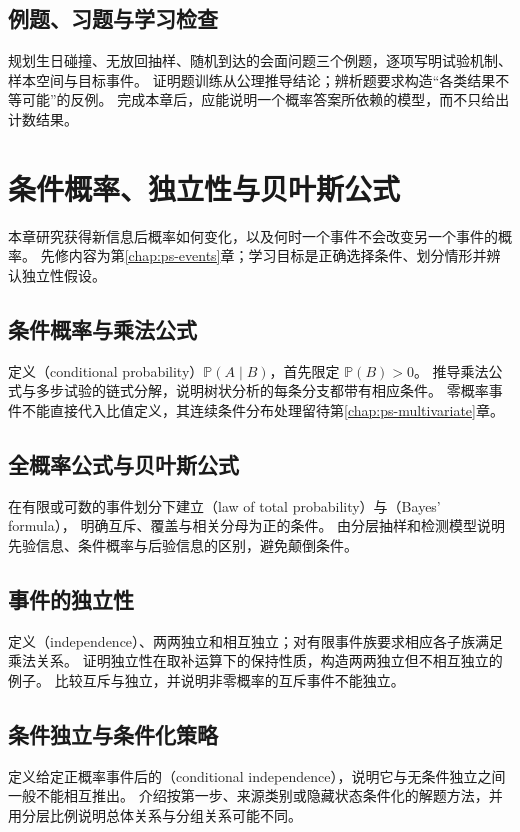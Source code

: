 \documentclass[UTF8,12pt,a4paper,fontset=fandol]{ctexbook}
\begin{document}
\section{例题、习题与学习检查}
规划生日碰撞、无放回抽样、随机到达的会面问题三个例题，逐项写明试验机制、样本空间与目标事件。
证明题训练从公理推导结论；辨析题要求构造“各类结果不等可能”的反例。
完成本章后，应能说明一个概率答案所依赖的模型，而不只给出计数结果。


\chapter{条件概率、独立性与贝叶斯公式}
\label{chap:ps-conditioning}

本章研究获得新信息后概率如何变化，以及何时一个事件不会改变另一个事件的概率。
先修内容为第\ref{chap:ps-events}章；学习目标是正确选择条件、划分情形并辨认独立性假设。

\section{条件概率与乘法公式}
\label{sec:ps-conditional-probability}
定义（conditional probability）$\mathbb P(A\mid B)$，首先限定 $\mathbb P(B)>0$。
推导乘法公式与多步试验的链式分解，说明树状分析的每条分支都带有相应条件。
零概率事件不能直接代入比值定义，其连续条件分布处理留待第\ref{chap:ps-multivariate}章。

\section{全概率公式与贝叶斯公式}
\label{sec:ps-total-bayes}
在有限或可数的事件划分下建立（law of total probability）与（Bayes' formula），
明确互斥、覆盖与相关分母为正的条件。
由分层抽样和检测模型说明先验信息、条件概率与后验信息的区别，避免颠倒条件。

\section{事件的独立性}
\label{sec:ps-event-independence}
定义（independence）、两两独立和相互独立；对有限事件族要求相应各子族满足乘法关系。
证明独立性在取补运算下的保持性质，构造两两独立但不相互独立的例子。
比较互斥与独立，并说明非零概率的互斥事件不能独立。

\section{条件独立与条件化策略}
\label{sec:ps-conditional-independence}
定义给定正概率事件后的（conditional independence），说明它与无条件独立之间一般不能相互推出。
介绍按第一步、来源类别或隐藏状态条件化的解题方法，并用分层比例说明总体关系与分组关系可能不同。
\end{document}

